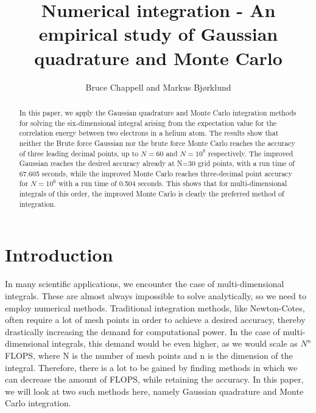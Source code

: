 \documentclass{emulateapj}
\begin{document}
\title{Numerical integration - An empirical study of Gaussian quadrature and Monte Carlo}

\author{Bruce Chappell and Markus Bjørklund}



\begin{abstract}

In this paper, we apply the Gaussian quadrature and Monte Carlo integration methods for solving the six-dimensional integral arising from the expectation value for the correlation energy between two electrons in a helium atom. The results show that neither the Brute force Gaussian nor the brute force Monte Carlo reaches the accuracy of three leading decimal points, up to $N=60$ and $N=10^8$ respectively. The improved Gaussian reaches the desired accuracy already at N=30 grid points, with a run time of 67.605 seconds, while the improved Monte Carlo reaches three-decimal point accuracy for $N=10^{6}$ with a run time of 0.504 seconds. This shows that for multi-dimensional integrals of this order, the improved Monte Carlo is clearly the preferred method of integration.

\end{abstract}

\section{Introduction}
\label{sec:introduction}

In many scientific applications, we encounter the case of multi-dimensional integrals. These are almost always impossible to solve analytically, so we need to employ numerical methods. Traditional integration methods, like Newton-Cotes, often require a lot of mesh points in order to achieve a desired accuracy, thereby drastically increasing the demand for computational power. In the case of multi-dimensional integrals, this demand would be even higher, as we would scale as $N^n$ FLOPS, where N is the number of mesh points and n is the dimension of the integral. Therefore, there is a lot to be gained by finding methods in which we can decrease the amount of FLOPS, while retaining the accuracy. In this paper, we will look at two such methods here, namely Gaussian quadrature and Monte Carlo integration.
\end{document}
